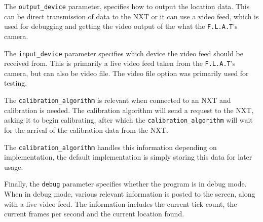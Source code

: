 The \texttt{output\_device} parameter, specifies how to output the location data.
This can be direct transmission of data to the NXT or it can use a video feed, which is used for debugging and getting the video output of the what the \texttt{F.L.A.T}'s camera.

The \texttt{input\_device} parameter specifies which device the video feed should be received from.
This is primarily a live video feed taken from the \texttt{F.L.A.T}'s camera, but can also be video file.
The video file option was primarily used for testing.

The \texttt{calibration\_algorithm} is relevant when connected to an NXT and calibration is needed.
The calibration algorithm will send a request to the NXT, asking it to begin calibrating, after which the \texttt{calibration\_algorithm} will wait for the arrival of the calibration data from the NXT.

The \texttt{calibration\_algorithm} handles this information depending on implementation, the default implementation is simply storing this data for later usage.

Finally, the \texttt{debug} parameter specifies whether the program is in debug mode.
When in debug mode, various relevant information is posted to the screen, along with a live video feed.
The information includes the current tick count, the current frames per second and the current location found.

